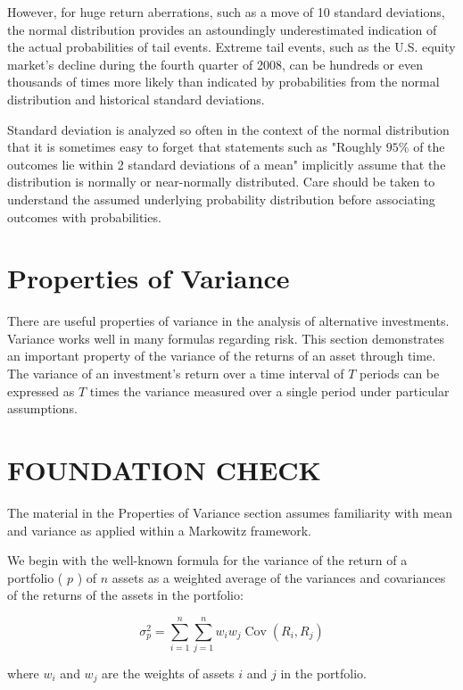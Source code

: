 \documentclass[11pt]{article}
\begin{document}
However, for huge return aberrations, such as a move of 10 standard deviations, the normal distribution provides an astoundingly underestimated indication of the actual probabilities of tail events. Extreme tail events, such as the U.S. equity market's decline during the fourth quarter of 2008, can be hundreds or even thousands of times more likely than indicated by probabilities from the normal distribution and historical standard deviations.

Standard deviation is analyzed so often in the context of the normal distribution that it is sometimes easy to forget that statements such as "Roughly $95 \%$ of the outcomes lie within 2 standard deviations of a mean" implicitly assume that the distribution is normally or near-normally distributed. Care should be taken to understand the assumed underlying probability distribution before associating outcomes with probabilities.

\section*{Properties of Variance}
There are useful properties of variance in the analysis of alternative investments. Variance works well in many formulas regarding risk. This section demonstrates an important property of the variance of the returns of an asset through time. The variance of an investment's return over a time interval of $T$ periods can be expressed as $T$ times the variance measured over a single period under particular assumptions.

\section*{FOUNDATION CHECK}
The material in the Properties of Variance section assumes familiarity with mean and variance as applied within a Markowitz framework.

We begin with the well-known formula for the variance of the return of a portfolio ( $p$ ) of $n$ assets as a weighted average of the variances and covariances of the returns of the assets in the portfolio:


\begin{equation*}
\sigma_{p}^{2}=\sum_{i=1}^{n} \sum_{j=1}^{n} w_{i} w_{j} \operatorname{Cov}\left(R_{i}, R_{j}\right) \tag{1}
\end{equation*}


where $w_{i}$ and $w_{j}$ are the weights of assets $i$ and $j$ in the portfolio.
\end{document}
